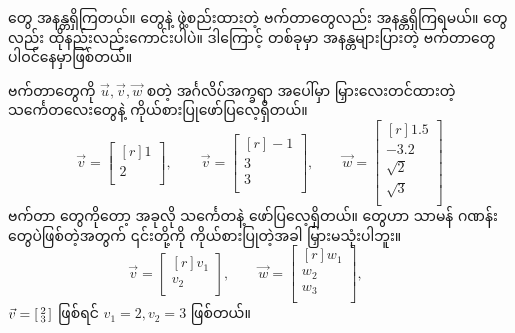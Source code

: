  တွေ အနန္တရှိကြတယ်။  တွေနဲ့ ဖွဲ့စည်းထားတဲ့  ဗက်တာတွေလည်း အနန္တရှိကြရမယ်။  တွေလည်း ထိုနည်းလည်းကောင်းပါပဲ။ ဒါကြောင့်  တစ်ခုမှာ အနန္တများပြားတဲ့ ဗက်တာတွေ ပါဝင်နေမှာဖြစ်တယ်။ 

ဗက်တာတွေကို \(\vec{u}, \vec{v}, \vec{w}\) စတဲ့ အင်္ဂလိပ်အက္ခရာ အပေါ်မှာ မြှားလေးတင်ထားတဲ့ သင်္ကေတလေးတွေနဲ့ ကိုယ်စားပြုဖော်ပြလေ့ရှိတယ်။
\[
\vec{v} = \begin{bmatrix*}[r] 1\\ 2\\ \end{bmatrix*}, \qquad
\vec{v} = \begin{bmatrix*}[r] -1\\ 3\\ 3\\\end{bmatrix*}, \qquad
\vec{w} = \begin{bmatrix*}[r] 1.5\\ -3.2\\ \sqrt{2}\\ \sqrt{3}\\\end{bmatrix*}
\]
ဗက်တာ  တွေကိုတော့ အခုလို သင်္ကေတနဲ့ ဖော်ပြလေ့ရှိတယ်။  တွေဟာ သာမန် ဂဏန်းတွေပဲဖြစ်တဲ့အတွက် ၎င်းတို့ကို ကိုယ်စားပြုတဲ့အခါ မြှားမသုံးပါဘူး။
\[
\vec{v} = \begin{bmatrix*}[r] v_{1} \\ v_{2} \\ \end{bmatrix*}, \qquad
\vec{w} = \begin{bmatrix*}[r] w_{1} \\ w_{2} \\ w_{3} \\ \end{bmatrix*}, \qquad
\]
\(\vec{v} = \begin{bsmallmatrix*}[r] 2 \\ 3\\ \end{bsmallmatrix*}\) ဖြစ်ရင် $v_{1}=2, v_{2}=3$ ဖြစ်တယ်။